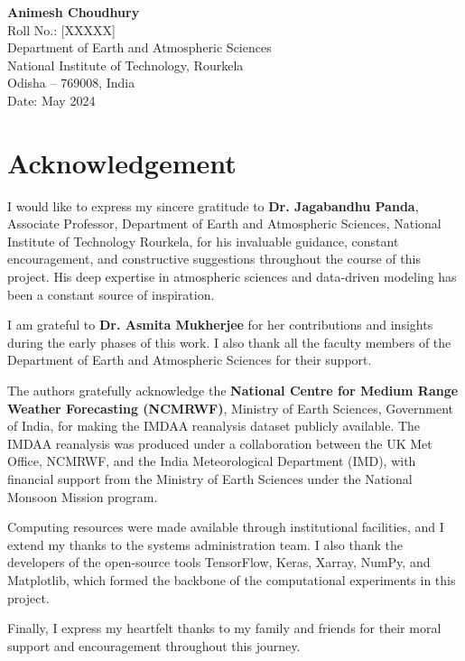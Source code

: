 \documentclass[12pt,a4paper,oneside]{report}
\begin{document}
\vspace{3cm}
\begin{flushright}
\textbf{Animesh Choudhury}\\
Roll No.: [XXXXX]\\
Department of Earth and Atmospheric Sciences\\
National Institute of Technology, Rourkela\\
Odisha -- 769008, India\\
Date: May 2024
\end{flushright}
\newpage

\thispagestyle{empty}
\chapter*{Acknowledgement}
I would like to express my sincere gratitude to \textbf{Dr. Jagabandhu Panda}, Associate Professor, Department of Earth and Atmospheric Sciences, National Institute of Technology Rourkela, for his invaluable guidance, constant encouragement, and constructive suggestions throughout the course of this project. His deep expertise in atmospheric sciences and data-driven modeling has been a constant source of inspiration.

I am grateful to \textbf{Dr. Asmita Mukherjee} for her contributions and insights during the early phases of this work. I also thank all the faculty members of the Department of Earth and Atmospheric Sciences for their support.

The authors gratefully acknowledge the \textbf{National Centre for Medium Range Weather Forecasting (NCMRWF)}, Ministry of Earth Sciences, Government of India, for making the IMDAA reanalysis dataset publicly available. The IMDAA reanalysis was produced under a collaboration between the UK Met Office, NCMRWF, and the India Meteorological Department (IMD), with financial support from the Ministry of Earth Sciences under the National Monsoon Mission program.

Computing resources were made available through institutional facilities, and I extend my thanks to the systems administration team. I also thank the developers of the open-source tools TensorFlow, Keras, Xarray, NumPy, and Matplotlib, which formed the backbone of the computational experiments in this project.

Finally, I express my heartfelt thanks to my family and friends for their moral support and encouragement throughout this journey.
\end{document}

